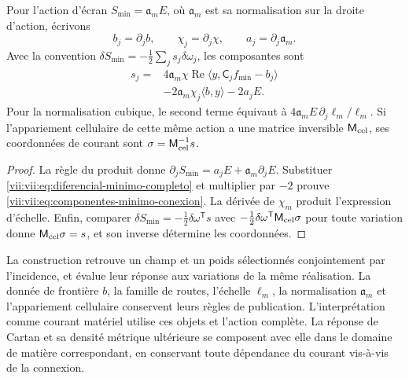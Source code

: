 \begin{theorem}
\label{vii:vii:thm:componentes-minimo-conexion}
Pour l'action d'écran
\(S_{\min}=\mathfrak a_m E\), où \(\mathfrak a_m\) est sa
normalisation sur la droite d'action, écrivons
\[
 b_j=\partial_jb,\qquad \chi_j=\partial_j\chi,
 \qquad a_j=\partial_j\mathfrak a_m.
\]
Avec la convention \(\delta S_{\min}=-\tfrac12\sum_j s_j\delta\omega_j\),
les composantes sont
\begin{equation}
 \begin{split}
 s_j={}&4\mathfrak a_m\chi\operatorname{Re}
             \langle y,\mathsf C_jf_{\min}-b_j\rangle\\
      &-2\mathfrak a_m\chi_j\langle b,y\rangle-2a_jE.
 \end{split}
 \label{vii:vii:eq:componentes-minimo-conexion}
\end{equation}
Pour la normalisation cubique, le second terme équivaut à
\(4\mathfrak a_m E\,\partial_j\ell_m/\ell_m\).
Si l'appariement cellulaire de cette même action a une matrice
inversible \(\mathsf M_{\rm cel}\), ses coordonnées de courant
sont \(\sigma=\mathsf M_{\rm cel}^{-1}s\).
\end{theorem}

\begin{proof}
La règle du produit donne
\(\partial_jS_{\min}=a_jE+\mathfrak a_m\partial_jE\).
Substituer \eqref{vii:vii:eq:diferencial-minimo-completo} et multiplier
par \(-2\) prouve \eqref{vii:vii:eq:componentes-minimo-conexion}.
La dérivée de \(\chi_m\) produit l'expression d'échelle.
Enfin, comparer
\(\delta S_{\min}=-\tfrac12\delta\omega^{\mathsf T}s\)
avec \(-\tfrac12\delta\omega^{\mathsf T}\mathsf M_{\rm cel}\sigma\)
pour toute variation donne \(\mathsf M_{\rm cel}\sigma=s\),
et son inverse détermine les coordonnées.
\end{proof}

La construction retrouve un champ et un poids sélectionnés conjointement
par l'incidence, et évalue leur réponse aux variations de la même
réalisation. La donnée de frontière \(b\), la famille de routes, l'échelle
\(\ell_m\), la normalisation \(\mathfrak a_m\) et l'appariement
cellulaire conservent leurs règles de publication. L'interprétation comme
courant matériel utilise ces objets et l'action complète. La
réponse de Cartan et sa densité métrique ultérieure se composent avec
elle dans le domaine de matière correspondant, en conservant toute
dépendance du courant vis-à-vis de la connexion.
